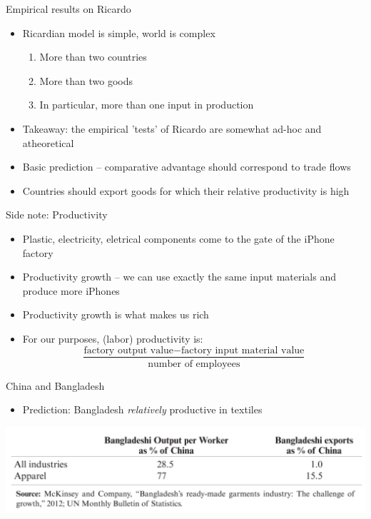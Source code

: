 \documentclass[ignorenonframetext,]{beamer}
\begin{document}
\begin{frame}{Empirical results on Ricardo}

    \begin{itemize}
        \item Ricardian model is simple, world is complex
        \begin{enumerate}
            \item More than two countries
            \item More than two goods 
            \item In particular, more than one input in production
        \end{enumerate}
        \item Takeaway: the empirical 'tests' of Ricardo are somewhat ad-hoc and atheoretical
        \item Basic prediction -- comparative advantage should correspond to trade flows 
        \item Countries should export goods for which their relative productivity is high 
    \end{itemize}

\end{frame}

\begin{frame}{Side note: Productivity}

    \begin{itemize}
        \item Plastic, electricity, eletrical components come to the gate of the iPhone factory
        \item Productivity growth -- we can use exactly the same input materials and produce more iPhones
        \item Productivity growth is what makes us rich
        \item For our purposes, (labor) productivity is: 
        \begin{equation*}
            \frac{\mbox{factory output value} - \mbox{factory input material value}}{\mbox{number of employees}}
        \end{equation*}
    \end{itemize}

\end{frame}

\begin{frame}{China and Bangladesh}

    \begin{itemize}
        \item Prediction: Bangladesh \emph{relatively} productive in textiles 
    \end{itemize}
    \includegraphics[scale=0.15]{bangladesh_china_cpa.png}

\end{frame}
\end{document}
